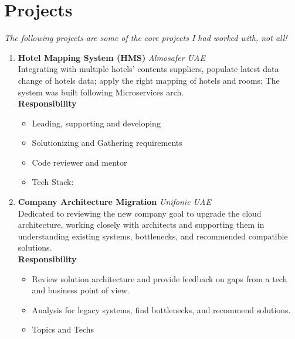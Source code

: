 \documentclass[%
               doublesided,
               paper=a4,
               fontsize=10pt
              ]{my-resume}
\begin{document}
    \section{Projects}
	\textit{\color{accent}The following projects are some of the core projects I had worked with, not all!}
    \begin{enumerate}
		\item 
		\textbf{\color{cyan}Hotel Mapping System (HMS) \faBank} \hfill \textit{Almosafer UAE \faMapMarker} \\
		Integrating with multiple hotels' contents suppliers, populate latest data change of hotels data; apply the right mapping of hotels and rooms; The system was built following Microservices arch.\\
		\textbf{Responsibility} 
		\begin{itemize}
			\setlength\itemsep{.0001em}
			\item Leading, supporting and developing 
			\item Solutionizing and Gathering requirements
			\item Code reviewer and mentor 
			\item \color{accent} Tech Stack: 
		\end{itemize}
		    
    
    	\item 
		\textbf{\color{cyan} Company Architecture Migration \faCogs} \hfill \textit{Unifonic UAE \faMapMarker} \\
		Dedicated to reviewing the new company goal to upgrade the cloud architecture, working closely with architects and supporting them in understanding existing systems, bottlenecks, and recommended compatible solutions.  	\\
		\textbf{Responsibility} 
		\begin{itemize}
			\item Review solution architecture and provide feedback on gaps from a tech and business point of view.  	
			\item Analysis for legacy systems, find bottlenecks, and recommend solutions.
			\item 
			\color{accent} {Topics and Techs}
		\end{itemize}
		

\end{enumerate}
\end{document}
